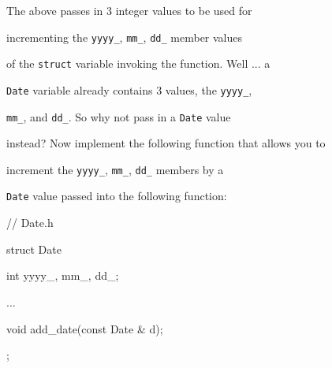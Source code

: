 The above passes in 3 integer values to be used for

incrementing the \texttt{yyyy\_}, \texttt{mm\_}, \texttt{dd\_} member values

of the \texttt{struct} variable invoking the function. Well ... a

\texttt{Date} variable already contains 3 values, the \texttt{yyyy\_},

\texttt{mm\_}, and \texttt{dd\_}. So why not pass in a \texttt{Date} value

instead? Now implement the following function that allows you to

increment the \texttt{yyyy\_}, \texttt{mm\_}, \texttt{dd\_} members by a

\texttt{Date} value passed into the following function:



\begin{consolethree}[escapeinside=||]

// Date.h

struct Date

{

    int yyyy_, mm_, dd_;

    ...

    void add_date(const Date & d);

};

\end{consolethree}

